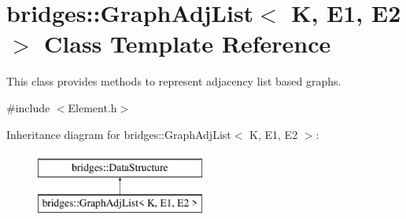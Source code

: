 \hypertarget{classbridges_1_1_graph_adj_list}{}\section{bridges\+:\+:Graph\+Adj\+List$<$ K, E1, E2 $>$ Class Template Reference}
\label{classbridges_1_1_graph_adj_list}


This class provides methods to represent adjacency list based graphs.  




{\ttfamily \#include $<$Element.\+h$>$}

Inheritance diagram for bridges\+:\+:Graph\+Adj\+List$<$ K, E1, E2 $>$\+:\begin{figure}[H]
\begin{center}
\leavevmode
\includegraphics[height=2.000000cm]{classbridges_1_1_graph_adj_list}
\end{center}
\end{figure}
